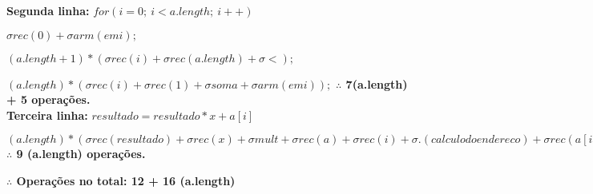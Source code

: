\documentclass{article}
\begin{document}
\textbf{Segunda linha:} $for(i = 0;\ i < a.length;\ i++)$

\noindent
$\sigma rec (0) + \sigma arm (em i);$

\noindent
$(a.length + 1) * (\sigma rec (i)  + \sigma rec (a.length) + \sigma <);$

\noindent
$(a.length) * (\sigma rec (i) + \sigma rec (1) + \sigma soma + \sigma arm (em i));$
\newline \indent
\textbf{$\therefore$ 7(a.length) + 5 operações.}
\\

\textbf{Terceira linha:} $resultado = resultado * x + a[i]$

\noindent
$ (a.length)*(\sigma rec (resultado) + \sigma rec (x) + \sigma mult + \sigma rec (a) + \sigma rec (i) + \sigma . (calculo do endereco) + \sigma rec (a[i]) + \sigma soma + \sigma arm (em resultado));$
\newline \indent
\textbf{$\therefore$ 9 (a.length) operações.}

\dotfill

\textbf{$\therefore$ Operações no total: 12 + 16 (a.length)}
\end{document}
